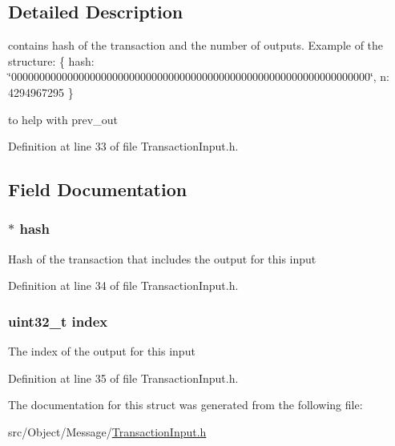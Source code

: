 \subsection{Detailed Description}
contains hash of the transaction and the number of outputs. Example of the structure: \{ hash: \char`\"{}0000000000000000000000000000000000000000000000000000000000000000\char`\"{}, n: 4294967295 \} 

to help with prev\_\-out 

Definition at line 33 of file TransactionInput.h.



\subsection{Field Documentation}
\hypertarget{struct_previous_output_a5695540112ce950745e15ab422b3f067}{
\subsubsection[{hash}]{$\ast$ {\bf hash}}}
\label{struct_previous_output_a5695540112ce950745e15ab422b3f067}
Hash of the transaction that includes the output for this input 

Definition at line 34 of file TransactionInput.h.

\hypertarget{struct_previous_output_aafd95f8c7a99b9189ede7cdf0871ebe8}{
\subsubsection[{index}]{\setlength{\rightskip}{0pt plus 5cm}uint32\_\-t {\bf index}}}
\label{struct_previous_output_aafd95f8c7a99b9189ede7cdf0871ebe8}
The index of the output for this input 

Definition at line 35 of file TransactionInput.h.



The documentation for this struct was generated from the following file:\begin{DoxyCompactItemize}
\item 
src/Object/Message/\hyperlink{_transaction_input_8h}{TransactionInput.h}\end{DoxyCompactItemize}
